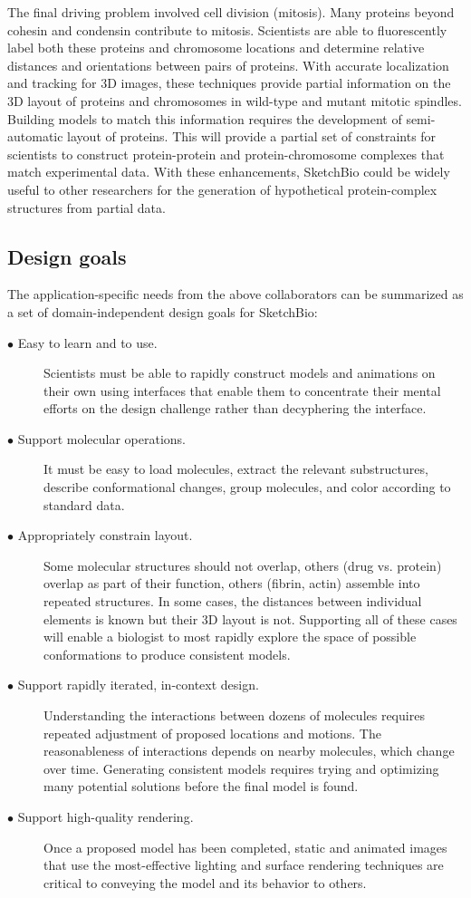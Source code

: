 \documentclass[twocolumn]{bmcart}%
\begin{document}
The final driving problem involved cell division (mitosis).
Many proteins beyond cohesin and condensin contribute to mitosis.  Scientists are able to fluorescently label both these proteins and chromosome locations and determine relative distances and orientations between pairs of proteins.
With accurate localization and tracking for 3D images, these techniques provide partial information on the 3D layout of proteins and chromosomes in wild-type and mutant mitotic spindles.
Building models to match this information requires the development of semi-automatic layout of proteins.
This will provide a partial set of constraints for scientists to construct protein-protein and protein-chromosome complexes that match experimental data.
With these enhancements, SketchBio could be widely useful to other researchers for the generation of hypothetical protein-complex structures from partial data.

\subsection*{Design goals}
The application-specific needs from the above collaborators can be summarized as a set of domain-independent design goals for SketchBio:
\begin{description}
  \item[$\bullet$ Easy to learn and to use.] Scientists must be able to rapidly construct models and animations on their own using interfaces that enable them to concentrate their mental efforts on the design challenge rather than decyphering the interface.
  \item[$\bullet$ Support molecular operations.] It must be easy to load molecules, extract the relevant substructures, describe conformational changes, group molecules, and color according to standard data.
  \item[$\bullet$ Appropriately constrain layout.] Some molecular structures should not overlap, others (drug vs. protein) overlap as part of their function, others (fibrin, actin) assemble into repeated structures.  In some cases, the distances between individual elements is known but their 3D layout is not.  Supporting all of these cases will enable a biologist to most rapidly explore the space of possible conformations to produce consistent models.
  \item[$\bullet$ Support rapidly iterated, in-context design.] Understanding the interactions between dozens of molecules requires repeated adjustment of proposed locations and motions.  The reasonableness of interactions depends on nearby molecules, which change over time.  Generating consistent models requires trying and optimizing many potential solutions before the final model is found.
  \item[$\bullet$ Support high-quality rendering.] Once a proposed model has been completed, static and animated images that use the most-effective lighting and surface rendering techniques are critical to conveying the model and its behavior to others.
\end{description}
\end{document}
